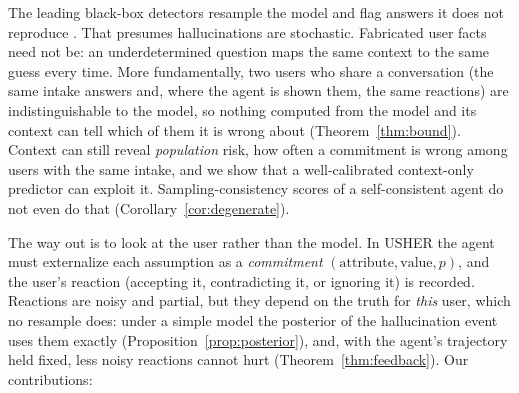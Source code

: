 \documentclass[10pt,a4paper,twocolumn]{article}
\begin{document}
The leading black-box detectors resample the model and flag answers it
does not reproduce \citep{manakul2023selfcheckgpt,kuhn2023semantic,farquhar2024detecting}.
That presumes hallucinations are stochastic. Fabricated user facts need not
be: an underdetermined question maps the same context to the same guess
every time. More fundamentally, two users who share a conversation (the same intake answers and, where the agent is shown them, the same reactions) are indistinguishable to the model, so nothing computed from the model and its context can tell which of them it is wrong about (Theorem~\ref{thm:bound}). Context can still reveal \emph{population}
risk, how often a commitment is wrong among users with the same intake, and we show that a well-calibrated context-only predictor can
exploit it. Sampling-consistency scores of a self-consistent agent do not even do that (Corollary~\ref{cor:degenerate}).

The way out is to look at the user rather than the model. In USHER the agent
must externalize each assumption as a \emph{commitment}
$(\text{attribute},\text{value},p)$, and the user's reaction (accepting it,
contradicting it, or ignoring it) is recorded. Reactions are noisy and partial, but they depend on the truth for \emph{this} user, which no resample does: under a simple model the posterior of the hallucination event uses them exactly (Proposition~\ref{prop:posterior}), and, with the agent's trajectory held fixed, less noisy reactions cannot hurt (Theorem~\ref{thm:feedback}). Our contributions:
\end{document}
